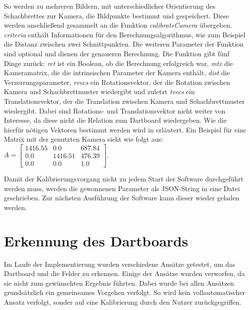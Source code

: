 So werden zu mehreren Bildern, mit unterschiedlicher Orientierung des Schachbrettes zur Kamera, die Bildpunkte bestimmt und gespeichert. Diese werden anschließend gesammelt an die Funktion \textit{calibrateCamera} übergeben. \textit{criteria} enthält Informationen für den Berechnungsalgorithmus, wie zum Beispiel die Distanz zwischen zwei Schnittpunkten. Die weiteren Parameter der Funktion sind optional und dienen der genaueren Berechnung.
Die Funktion gibt fünf Dinge zurück: \textit{ret} ist ein Boolean, ob die Berechnung erfolgreich war, \textit{mtx} die Kameramatrix, die die intrinsischen Parameter der Kamera enthält, \textit{dist} die Verzerrungsparameter, \textit{rvecs} ein Rotationsvektor, der die Rotation zwischen Kamera und Schachbrettmuster wiedergibt und zuletzt \textit{tvecs} ein Translationsvektor, der die Translation zwischen Kamera und Schachbrettmuster wiedergibt. Dabei sind Rotations- und Translationsvektor nicht weiter von Interesse, da diese nicht die Relation zum Dartboard wiedergeben. Wie die hierfür nötigen Vektoren bestimmt werden wird in  erläutert. Ein Beispiel für eine Matrix mit der genutzten Kamera sieht wie folgt aus:
$A= 
\begin{bmatrix} 
1416.55 & 0.0 & 687.84 \\
0.0 & 1416.51 & 476.39 \\
0.0 & 0.0 & 1.0\end{bmatrix}$.

Damit der Kalibrierungsvorgang nicht zu jedem Start der Software durchgeführt werden muss, werden die gewonnenen Parameter als JSON-String in eine Datei geschrieben. Zur nächsten Ausführung der Software kann dieser wieder geladen werden. 


\section{Erkennung des Dartboards}
\label{sec:board}
%        
Im Laufe der Implementierung wurden verschiedene Ansätze getestet, um das Dartboard und die Felder zu erkennen. Einige der Ansätze wurden verworfen, da sie nicht  zum gewünschten Ergebnis führten. Dabei wurde bei allen Ansätzen grundsätzlich ein gemeinsames Vorgehen verfolgt. So wird kein vollautomatischer Ansatz verfolgt, sonder auf eine Kalibrierung durch den Nutzer zurückgegriffen. 

